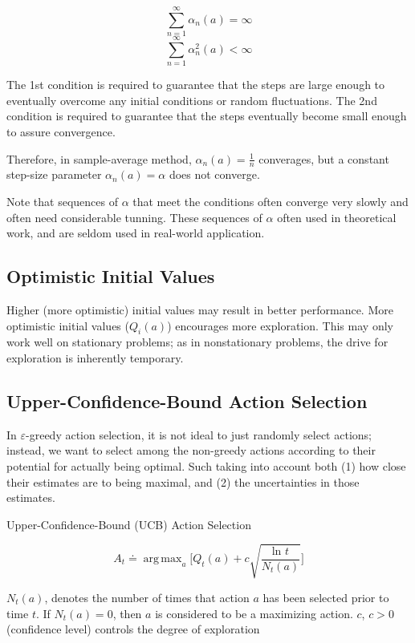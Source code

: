 \documentclass[lang=en,mode=geye,device=normal,color=blue,14pt]{elegantnote}
\DeclareMathOperator*{\1}{\mathbbm{1}}
\DeclareMathOperator*{\argmax}{arg\,max}
\begin{document}
$$ \sum_{n=1}^\infty \alpha_n(a) = \infty $$
$$ \sum_{n=1}^\infty \alpha_n^2(a) < \infty $$

The 1st condition is required to guarantee that the steps are large enough to eventually overcome any initial conditions or random fluctuations.
The 2nd condition is required to guarantee that the steps eventually become small enough to assure convergence.

Therefore, in sample-average method, $\alpha_n(a) = \frac{1}{n}$ converages, but a constant step-size parameter $\alpha_n(a)=\alpha$ does not converge.

Note that sequences of $\alpha$ that meet the conditions often converge very slowly and often need considerable tunning.
These sequences of $\alpha$ often used in theoretical work, and are seldom used in real-world application.

\subsection{Optimistic Initial Values}

Higher (more optimistic) initial values may result in better performance. More optimistic initial values ($Q_i(a)$) encourages more exploration.
This may only work well on stationary problems; as in nonstationary problems, the drive for exploration is inherently temporary.

\subsection{Upper-Confidence-Bound Action Selection}

In $\varepsilon$-greedy action selection, it is not ideal to just randomly select actions; instead, we want to select among the non-greedy actions according to their potential for actually being optimal. Such taking into account both (1) how close their estimates are to being maximal, and (2) the uncertainties in those estimates.

\begin{definition}
Upper-Confidence-Bound (UCB) Action Selection

\[
A_t \doteq \argmax_a \bigg[ Q_t(a) + c\sqrt{\frac{\text{ln }t}{N_t(a)}} \bigg]
\]
\end{definition}
$N_t(a)$, denotes the number of times that action $a$ has been selected prior to time $t$. If $N_t(a)=0$, then $a$ is considered to be a maximizing action.
$c$, $c > 0$ (confidence level) controls the degree of exploration
\end{document}
